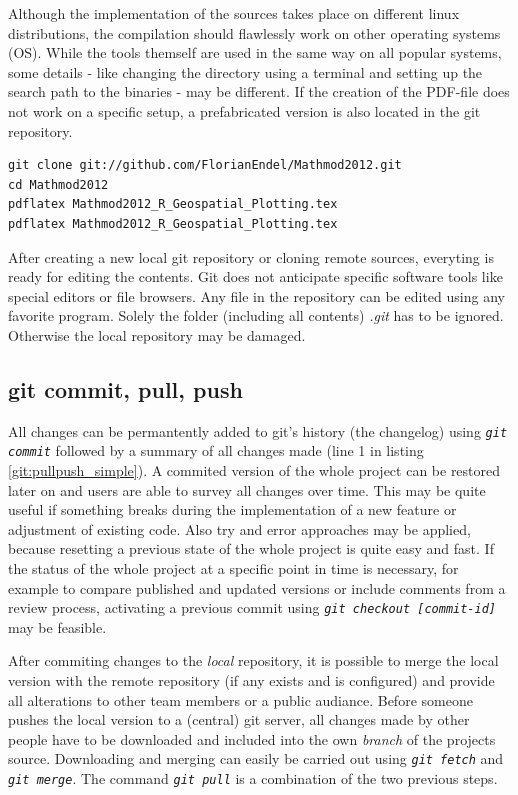 \documentclass{ifacconf}
\begin{document}
Although the implementation of the sources takes place on different
linux distributions, the compilation should flawlessly work on other operating systems (OS).
While the tools themself are used in the same way on all popular systems, some details
- like changing the directory using a terminal and setting up the search path to the binaries - may be different.
If the creation of the PDF-file does not work on a specific setup, a prefabricated
version is also located in the git repository. 

\begin{lstlisting}
git clone git://github.com/FlorianEndel/Mathmod2012.git
cd Mathmod2012
pdflatex Mathmod2012_R_Geospatial_Plotting.tex
pdflatex Mathmod2012_R_Geospatial_Plotting.tex
\end{lstlisting}

After creating a new local git repository or cloning remote sources, everyting is ready for
editing the contents. Git does not anticipate specific software tools like special editors or file browsers. Any file in 
the repository can be edited using any favorite program. Solely the folder (including all contents)
\textit{.git} has to be ignored. Otherwise the local repository may be damaged.

\subsection{git commit, pull, push}
All changes can be permantently 
added to git's history (the changelog) using \textit{\lstinline!git commit!} followed by a 
summary of all changes made (line 1 in listing \ref{git:pullpush_simple}). 
A commited version of the whole project can be restored later on and users are able to
survey all changes over time. This may be
quite useful if something breaks during the implementation of a new feature or adjustment of existing code.
Also try and error approaches may be applied, because resetting a previous state of the whole project is 
quite easy and fast. If the status of the whole project at a specific point in time is necessary, for example
to compare published and updated versions or include comments from a review process, activating  
a previous commit using \textit{\lstinline!git checkout [commit-id]!} may be feasible.

After commiting changes to the \textit{local} repository, it is possible to merge the local version 
with the remote repository (if any exists and is configured) and provide all alterations to other team members or a
public audiance. Before someone pushes the local version to a (central) git server, all changes made
by other people have to be downloaded and included into the own \textit{branch} of the projects source.
Downloading and merging can easily be carried out using \textit{\lstinline!git fetch!} and 
\textit{\lstinline!git merge!}. The command \textit{\lstinline!git pull!} is a combination of
the two previous steps.
\end{document}

